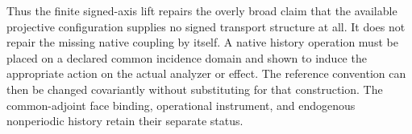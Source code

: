 Thus the finite signed-axis lift repairs the overly broad claim that the available projective configuration supplies no signed transport structure at all. It does not repair the missing native coupling by itself. A native history operation must be placed on a declared common incidence domain and shown to induce the appropriate action on the actual analyzer or effect. The reference convention can then be changed covariantly without substituting for that construction. The common-adjoint face binding, operational instrument, and endogenous nonperiodic history retain their separate status.
\endgroup
\setcounter{section}{27}
